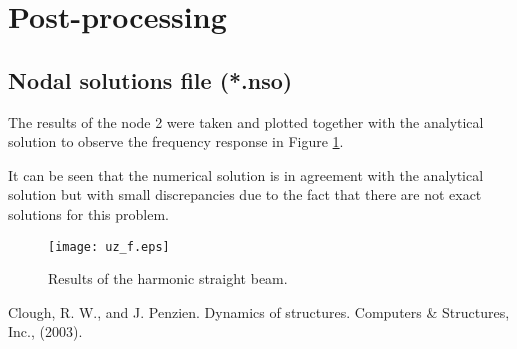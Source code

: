\documentclass[a4]{article}
\begin{document}
\section{Post-processing}

\subsection{Nodal solutions file (*.nso)}
The results of the node 2 were taken and plotted together with the analytical solution to observe the frequency response in Figure \ref{fig:beam_results}.

It can be seen that the numerical solution is in agreement with the analytical solution but with small discrepancies due to the fact that there are not exact solutions for this problem.

\begin{figure}[h]
	\centering
	\texttt{[image: uz\_f.eps]}
	\caption{Results of the harmonic straight beam.}
	\label{fig:beam_results}
\end{figure}

\begin{thebibliography}{99}
	
	 Clough, R. W., and J. Penzien. Dynamics of structures. Computers \& Structures, Inc., (2003).
	
\end{thebibliography}
\end{document}
